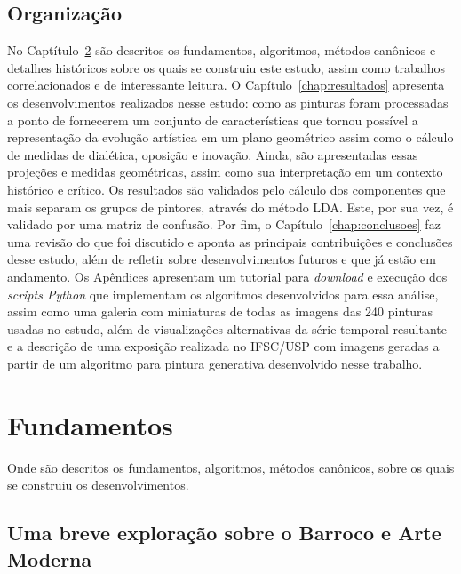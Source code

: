 \section{Organização}

No Captítulo~\ref{cap:fundamentos} são descritos os fundamentos, algoritmos,
métodos canônicos e detalhes históricos sobre os quais se construiu este estudo,
assim como trabalhos correlacionados e de interessante leitura. O
Capítulo~\ref{chap:resultados} apresenta os desenvolvimentos realizados nesse
estudo: como as pinturas foram processadas a ponto de fornecerem um conjunto de
características que tornou possível a representação da evolução artística em um
plano geométrico assim como o cálculo de medidas de dialética, oposição e
inovação. Ainda, são apresentadas essas projeções e medidas geométricas, assim
como sua interpretação em um contexto histórico e crítico. Os resultados são
validados pelo cálculo dos componentes que mais separam os grupos de pintores,
através do método LDA. Este, por sua vez, é validado por uma matriz de
confusão. Por fim, o Capítulo~\ref{chap:conclusoes} faz uma revisão do que foi
discutido e aponta as principais contribuições e conclusões desse estudo, além
de refletir sobre desenvolvimentos futuros e que já estão em andamento. Os
Apêndices apresentam um tutorial para \textit{download} e execução dos
\textit{scripts Python} que implementam os algoritmos desenvolvidos para essa
análise, assim como uma galeria com miniaturas de todas as imagens das 240
pinturas usadas no estudo, além de visualizações alternativas da série temporal
resultante e a descrição de uma exposição realizada no IFSC/USP com imagens
geradas a partir de um algoritmo para pintura generativa desenvolvido nesse
trabalho.


\chapter{Fundamentos}
\label{cap:fundamentos}

Onde são descritos os fundamentos, algoritmos, métodos canônicos, sobre os quais
se construiu os desenvolvimentos.

\section{Uma breve exploração sobre o Barroco e Arte Moderna}
\label{sec:breve}

